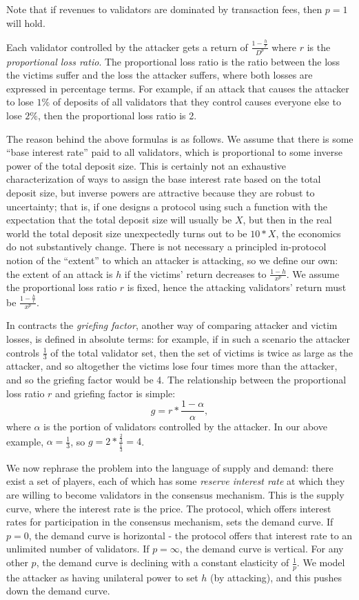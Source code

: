 \documentclass[12pt]{article}
\begin{document}
Note that if revenues to validators are dominated by transaction fees, then $p=1$ will hold.

Each validator controlled by the attacker gets a return of $\frac{1-\frac{h}{r}}{D^p}$ where $r$ is the \textit{proportional loss ratio}. The proportional loss ratio is the ratio between the loss the victims suffer and the loss the attacker suffers, where both losses are expressed in percentage terms. For example, if an attack that causes the attacker to lose $1\%$ of deposits of all validators that they control causes everyone else to lose $2\%$, then the proportional loss ratio is 2.

The reason behind the above formulas is as follows. We assume that there is some ``base interest rate'' paid to all validators, which is proportional to some inverse power of the total deposit size. This is certainly not an exhaustive characterization of ways to assign the base interest rate based on the total deposit size, but inverse powers are attractive because they are robust to uncertainty; that is, if one designs a protocol using such a function with the expectation that the total deposit size will usually be $X$, but then in the real world the total deposit size unexpectedly turns out to be $10 * X$, the economics do not substantively change. There is not necessary a principled in-protocol notion of the ``extent'' to which an attacker is attacking, so we define our own: the extent of an attack is $h$ if the victims' return decreases to $\frac{1-h}{x^p}$. We assume the proportional loss ratio $r$ is fixed, hence the attacking validators' return must be $\frac{1-\frac{h}{r}}{x^p}$.

In contracts the \textit{griefing factor}, another way of comparing attacker and victim losses, is defined in absolute terms: for example, if in such a scenario the attacker controls $\frac{1}{3}$ of the total validator set, then the set of victims is twice as large as the attacker, and so altogether the victims lose four times more than the attacker, and so the griefing factor would be 4. The relationship between the proportional loss ratio $r$ and griefing factor is simple: $$g = r * \frac{1-\alpha}{\alpha},$$ where $\alpha$ is the portion of validators controlled by the attacker. In our above example, $\alpha = \frac{1}{3}$, so $g = 2 * \frac{\frac{2}{3}}{\frac{1}{3}} = 4$.

We now rephrase the problem into the language of supply and demand: there exist a set of players, each of which has some \textit{reserve interest rate} at which they are willing to become validators in the consensus mechanism. This is the supply curve, where the interest rate is the price. The protocol, which offers interest rates for participation in the consensus mechanism, sets the demand curve. If $p=0$, the demand curve is horizontal - the protocol offers that interest rate to an unlimited number of validators. If $p=\infty$, the demand curve is vertical. For any other $p$, the demand curve is declining with a constant elasticity of $\frac{1}{p}$. We model the attacker as having unilateral power to set $h$ (by attacking), and this pushes down the demand curve.
\end{document}
